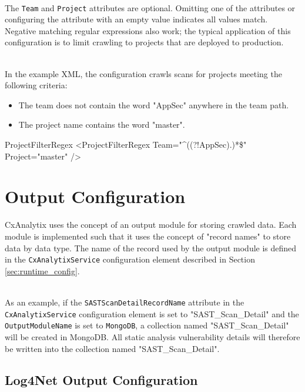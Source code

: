 \noindent\\The \texttt{Team} and \texttt{Project} attributes are optional.  Omitting one of the attributes or configuring the attribute with an empty
value indicates all values match.  Negative matching regular expressions also work; the typical application of this configuration is to limit crawling
to projects that are deployed to production.

\noindent\\In the example XML, the configuration crawls scans for projects meeting the following criteria:

\begin{itemize}
    \item The team does not contain the word "AppSec" anywhere in the team path.
    \item The project name contains the word "master".
\end{itemize}

\begin{xml}{ProjectFilterRegex}{}{}
<ProjectFilterRegex 
    Team="^((?!AppSec).)*\$" 
    Project="master"
    />
\end{xml}
    


\section{Output Configuration}

CxAnalytix uses the concept of an output module for storing crawled data.  Each module is implemented such that it uses the concept of "record names" 
to store data by data type.  The name of the record used by the output module is defined in the \texttt{CxAnalytixService} configuration element described
in Section \ref{sec:runtime_config}.

\noindent\\As an example, if the \texttt{SASTScanDetailRecordName} attribute in the \texttt{CxAnalytixService} configuration element is set to
"SAST\_Scan\_Detail" and the \texttt{OutputModuleName} is set to \texttt{MongoDB}, a collection named "SAST\_Scan\_Detail" will be created in MongoDB.
All static analysis vulnerability details will therefore be written into the collection named "SAST\_Scan\_Detail".

\subsection{Log4Net Output Configuration}

